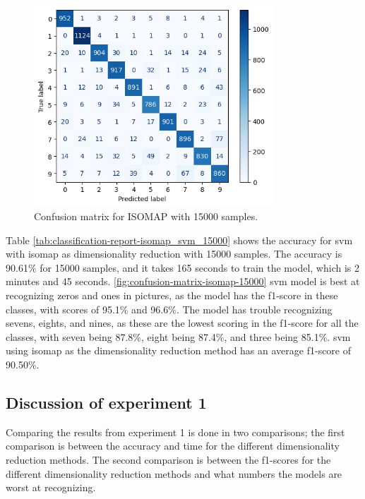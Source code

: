 \begin{figure}[htb!]
    \centering
    \includegraphics[width=0.8\textwidth]{figures/1-experiment/confusion_matrix_isomap_svm_15000.png}
    \caption{Confusion matrix for ISOMAP with 15000 samples.}
    \label{fig:confusion-matrix-isomap-15000}
\end{figure}


Table \ref{tab:classification-report-isomap_svm_15000} shows the accuracy for \gls{svm} with \gls{isomap} as dimensionality reduction with 15000 samples. The accuracy is 90.61\% for 15000 samples, and it takes 165 seconds to train the model, which is 2 minutes and 45 seconds. \autoref{fig:confusion-matrix-isomap-15000} \gls{svm} model is best at recognizing zeros and ones in pictures, as the model has the f1-score in these classes, with scores of 95.1\% and 96.6\%. The model has trouble recognizing sevens, eights, and nines, as these are the lowest scoring in the f1-score for all the classes, with seven being 87.8\%, eight being 87.4\%, and three being 85.1\%. \gls{svm} using \gls{isomap} as the dimensionality reduction method has an average f1-score of 90.50\%.

\subsection{Discussion of experiment 1}\label{sec:discussion-experiment-1}
Comparing the results from experiment 1 is done in two comparisons; the first comparison is between the accuracy and time for the different dimensionality reduction methods. The second comparison is between the f1-scores for the different dimensionality reduction methods and what numbers the models are worst at recognizing.

